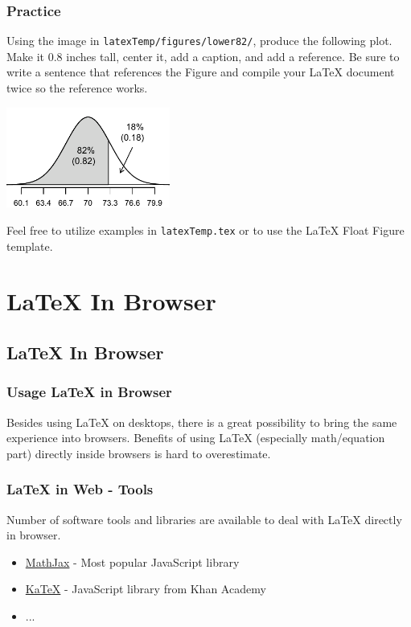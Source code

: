 \documentclass[slidestop,compress,mathserif]{beamer}
\begin{document}
\begin{frame}	\frametitle{Practice}
	
	Using the image in \texttt{\color{highlight}latexTemp/figures/lower82/}, produce the following plot. Make it 0.8 inches tall, center it, add a caption, and add a reference. Be sure to write a sentence that references the Figure and compile your LaTeX document twice so the reference works. \\
	
		\begin{center}
			\includegraphics[height=1.3in]{basicsOfLatex/latexTemp/figures/lower82/lower82}
		\end{center}
		
	Feel free to utilize examples in \texttt{\color{highlight}latexTemp.tex} or to use the LaTeX Float Figure template.
		
\end{frame}

\section[LaTeX In Browser]{LaTeX In Browser}

\subsection{LaTeX In Browser}
	
	\begin{frame} \frametitle{Usage LaTeX in Browser}
		Besides using LaTeX on desktops, there is a great possibility to bring the same experience into browsers. Benefits of using LaTeX (especially math/equation part) directly inside browsers is hard to overestimate.
	\end{frame}
	
	\begin{frame} \frametitle{LaTeX in Web - Tools}
		Number of software tools and libraries are available to deal with LaTeX directly in browser.\\
		
		\begin{itemize}
			\item \href{https://www.mathjax.org/}{MathJax} - Most popular JavaScript library
			\item \href{https://khan.github.io/KaTeX/}{KaTeX} - JavaScript library from Khan Academy
			\item ...
		\end{itemize}
	
	\end{frame}
	
\end{document}

